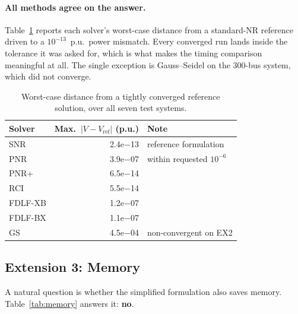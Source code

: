 \documentclass[sigconf,nonacm]{acmart}
\begin{document}
\paragraph{All methods agree on the answer.}
Table~\ref{tab:agreement} reports each solver's worst-case distance from a
standard-NR reference driven to a $10^{-13}$~p.u.\ power mismatch. Every
converged run lands inside the tolerance it was asked for, which is what makes
the timing comparison meaningful at all. The single exception is Gauss--Seidel
on the 300-bus system, which did not converge.

\begin{table}[t]
\centering
\caption{Worst-case distance from a tightly converged reference solution, over
all seven test systems.}
\label{tab:agreement}
\small
\begin{tabular}{l r l}
\toprule
Solver & Max.\ $|V - V_{\mathrm{ref}}|$ (p.u.) & Note \\
\midrule
SNR     & 2.4e$-$13 & reference formulation \\
PNR     & 3.9e$-$07 & within requested $10^{-6}$ \\
PNR+    & 6.5e$-$14 & \\
RCI     & 5.5e$-$14 & \\
FDLF-XB & 1.2e$-$07 & \\
FDLF-BX & 1.1e$-$07 & \\
GS      & 4.5e$-$04 & non-convergent on EX2 \\
\bottomrule
\end{tabular}
\end{table}

\subsection{Extension 3: Memory}
\label{sec:res-memory}
A natural question is whether the simplified formulation also saves memory.
Table~\ref{tab:memory} answers it: \textbf{no}.
\end{document}
